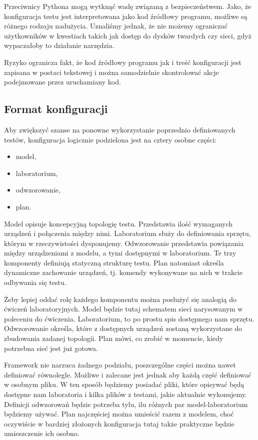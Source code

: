 \documentclass[00-praca-magisterska.tex]{subfiles}
\begin{document}
Przeciwnicy Pythona mogą wytknąć wadę związaną z bezpieczeństwem. Jako, że
konfiguracja testu jest interpretowana jako kod źródłowy programu, możliwe są
różnego rodzaju nadużycia. Uznaliśmy jednak, że nie możemy ograniczać
użytkowników w kwestiach takich jak dostęp do dysków twardych czy sieci, gdyż
wypaczałoby to działanie narzędzia.

Ryzyko ogranicza fakt, że kod źródłowy programu jak i treść konfiguracji jest
zapisana w postaci tekstowej i można samodzielnie skontrolować akcje
podejmowane przez uruchamiany kod.

\subsection{Format konfiguracji}

Aby zwiększyć szanse na ponowne wykorzystanie poprzednio definiowanych
testów, konfiguracja logicznie podzielona jest na cztery osobne części:
\begin{itemize}
\item model,
\item laboratorium,
\item odwzorowanie, 
\item plan.
\end{itemize}

Model opisuje koncepcyjną topologię testu. Przedstawia ilość wymaganych
urządzeń i połączenia między nimi. Laboratorium służy do definiowania sprzętu,
którym w rzeczywistości dysponujemy. Odwzorowanie przedstawia powiązania między
urządzeniami z modelu, a tymi dostępnymi w laboratorium. Te trzy komponenty
definiują statyczną strukturę testu. Plan natomiast określa dynamiczne
zachowanie urządzeń, tj.  komendy wykonywane na nich w trakcie odbywania się
testu.

Żeby lepiej oddać rolę każdego komponentu można posłużyć się analogią do
ćwiczeń laboratoryjnych. Model będzie tutaj schematem sieci narysowanym w
poleceniu do ćwiczenia. Laboratorium, to po prostu spis dostępnego nam
sprzętu. Odwzorowanie określa, które z dostępnych urządzeń zostaną wykorzystane
do zbudowania zadanej topologii. Plan mówi, co zrobić w momencie, kiedy
potrzebna sieć jest już gotowa.

Framework nie narzuca żadnego podziału, poszczególne części można nawet
definiować równolegle. Możliwe i zalecane jest jednak aby każdą część
definiować w osobnym pliku. W ten sposób będziemy posiadać pliki,
które opisywać będą dostępne nam laboratoria i kilka plików z testami, jakie
aktualnie wykonujemy. Definicji odwzorowań będzie potrzeba tylu, ilu różnych
par model-laboratorium będziemy używać. Plan najczęściej można umieścić razem z
modelem, choć oczywiście w bardziej złożonych konfiguracja tutaj także
praktyczne będzie umieszczenie ich osobno.
\end{document}
